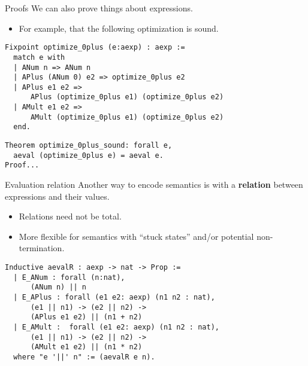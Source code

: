 \begin{frame}[fragile]{Proofs}
We can also prove things about expressions.

\begin{itemize}
\item For example, that the following optimization is sound.
\end{itemize}

\begin{block}{}
\small{\begin{verbatim}
Fixpoint optimize_0plus (e:aexp) : aexp := 
  match e with
  | ANum n => ANum n
  | APlus (ANum 0) e2 => optimize_0plus e2
  | APlus e1 e2 => 
      APlus (optimize_0plus e1) (optimize_0plus e2)
  | AMult e1 e2 => 
      AMult (optimize_0plus e1) (optimize_0plus e2)
  end.
\end{verbatim}}
\end{block}

\begin{block}{}
\small{\begin{verbatim}
Theorem optimize_0plus_sound: forall e,
  aeval (optimize_0plus e) = aeval e.
Proof...
\end{verbatim}}
\end{block}
\end{frame}

\begin{frame}[fragile]{Evaluation relation}
Another way to encode semantics is with a \textbf{relation} between 
expressions and their values.

\begin{itemize}
\item Relations need not be total.
\item More flexible for semantics with ``stuck states'' and/or potential 
non-termination.
\end{itemize}

\begin{block}{}
\small\begin{verbatim}
Inductive aevalR : aexp -> nat -> Prop :=
  | E_ANum : forall (n:nat), 
      (ANum n) || n
  | E_APlus : forall (e1 e2: aexp) (n1 n2 : nat), 
      (e1 || n1) -> (e2 || n2) -> 
      (APlus e1 e2) || (n1 + n2) 
  | E_AMult :  forall (e1 e2: aexp) (n1 n2 : nat), 
      (e1 || n1) -> (e2 || n2) -> 
      (AMult e1 e2) || (n1 * n2)
  where "e '||' n" := (aevalR e n).
\end{verbatim}
\end{block}
\end{frame}

